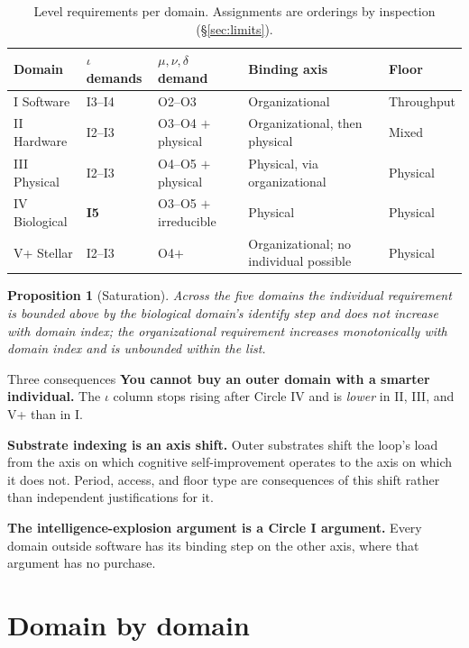 \documentclass[11pt]{article}
\newtheorem{proposition}{Proposition}
\begin{document}
\begin{table}[h]
\centering\small
\begin{tabularx}{\textwidth}{@{}lllYl@{}}
\toprule
Domain & $\iota$ demands & $\mu,\nu,\delta$ demand & Binding axis & Floor \\
\midrule
I Software   & I3--I4 & O2--O3 & Organizational & Throughput \\
II Hardware  & I2--I3 & O3--O4 $+$ physical & Organizational, then physical & Mixed \\
III Physical & I2--I3 & O4--O5 $+$ physical & Physical, via organizational & Physical \\
IV Biological& \textbf{I5} & O3--O5 $+$ irreducible & Physical & Physical \\
V+ Stellar   & I2--I3 & O4$+$ & Organizational; no individual possible & Physical \\
\bottomrule
\end{tabularx}
\caption{Level requirements per domain. Assignments are orderings by inspection (\S\ref{sec:limits}).}
\end{table}

\begin{proposition}[Saturation]\label{prop:sat}
Across the five domains the individual requirement is bounded above by the biological domain's identify step and does not increase with domain index; the organizational requirement increases monotonically with domain index and is unbounded within the list.
\end{proposition}

\begin{claimbox}{Three consequences}
\textbf{You cannot buy an outer domain with a smarter individual.} The $\iota$ column stops rising after Circle IV and is \emph{lower} in II, III, and V+ than in I.

\textbf{Substrate indexing is an axis shift.} Outer substrates shift the loop's load from the axis on which cognitive self-improvement operates to the axis on which it does not. Period, access, and floor type are consequences of this shift rather than independent justifications for it.

\textbf{The intelligence-explosion argument is a Circle I argument.} Every domain outside software has its binding step on the other axis, where that argument has no purchase.
\end{claimbox}

\section{Domain by domain}
\end{document}
